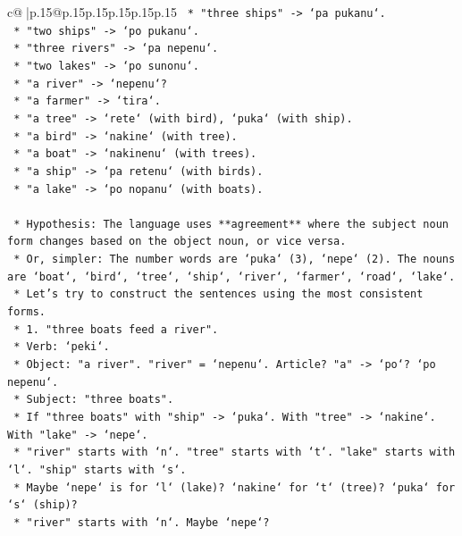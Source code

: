 \documentclass{article}
\begin{document}
{\begin{supertabular}{c@{$\;$}|p{.15\linewidth}@{}p{.15\linewidth}p{.15\linewidth}p{.15\linewidth}p{.15\linewidth}p{.15\linewidth}}
{{{\texttt{        *   "three ships" {-}> `pa pukanu`.} \\
\texttt{        *   "two ships" {-}> `po pukanu`.} \\
\texttt{        *   "three rivers" {-}> `pa nepenu`.} \\
\texttt{        *   "two lakes" {-}> `po sunonu`.} \\
\texttt{        *   "a river" {-}> `nepenu`?} \\
\texttt{        *   "a farmer" {-}> `tira`.} \\
\texttt{        *   "a tree" {-}> `rete` (with bird), `puka` (with ship).} \\
\texttt{        *   "a bird" {-}> `nakine` (with tree).} \\
\texttt{        *   "a boat" {-}> `nakinenu` (with trees).} \\
\texttt{        *   "a ship" {-}> `pa retenu` (with birds).} \\
\texttt{        *   "a lake" {-}> `po nopanu` (with boats).} \\
\\ 
\texttt{    *   Hypothesis: The language uses **agreement** where the subject noun form changes based on the object noun, or vice versa.} \\
\texttt{    *   Or, simpler: The number words are `puka` (3), `nepe` (2). The nouns are `boat`, `bird`, `tree`, `ship`, `river`, `farmer`, `road`, `lake`.} \\
\texttt{    *   Let's try to construct the sentences using the most consistent forms.} \\
\texttt{    *   1. "three boats feed a river".} \\
\texttt{        *   Verb: `peki`.} \\
\texttt{        *   Object: "a river". "river" = `nepenu`. Article? "a" {-}> `po`? `po nepenu`.} \\
\texttt{        *   Subject: "three boats".} \\
\texttt{        *   If "three boats" with "ship" {-}> `puka`. With "tree" {-}> `nakine`. With "lake" {-}> `nepe`.} \\
\texttt{        *   "river" starts with `n`. "tree" starts with `t`. "lake" starts with `l`. "ship" starts with `s`.} \\
\texttt{        *   Maybe `nepe` is for `l` (lake)? `nakine` for `t` (tree)? `puka` for `s` (ship)?} \\
\texttt{        *   "river" starts with `n`. Maybe `nepe`?} \\
}}}
\end{supertabular}}
\end{document}
